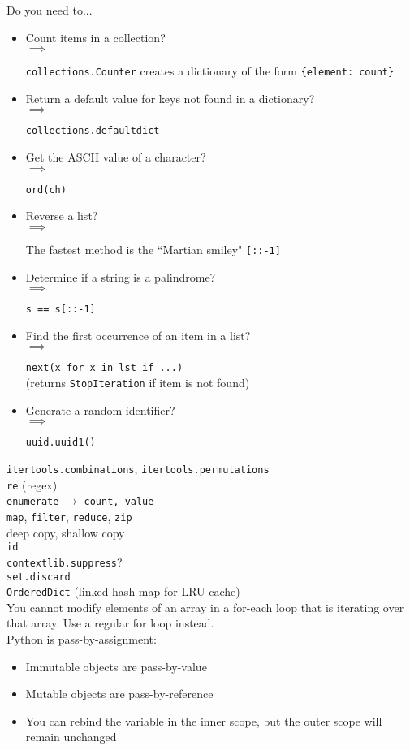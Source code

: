 \documentclass[12pt, titlepage]{article}
\newcommand{\imply}[1]{
  \-\hspace{1em}$\implies$ \parbox[t]{11.2cm}{#1}
}
\begin{document}
Do you need to...
\begin{itemize}
  \item Count items in a collection? \smallskip\\
    \imply{\texttt{collections.Counter} creates a dictionary of the form \texttt{\{element: count\}}}
  \item Return a default value for keys not found in a dictionary? \smallskip\\
    \imply{\texttt{collections.defaultdict}}
  \item Get the ASCII value of a character? \smallskip\\
    \imply{\texttt{ord(ch)}}
  \item Reverse a list? \smallskip\\
    \imply{The fastest method is the ``Martian smiley" \texttt{[::-1]}}
  \item Determine if a string is a palindrome? \smallskip\\
    \imply{\texttt{s == s[::-1]}}
  \item Find the first occurrence of an item in a list? \smallskip\\
      \imply{\texttt{next(x for x in lst if ...)} \\
      (returns \texttt{StopIteration} if item is not found)}
  \item Generate a random identifier? \\
      \imply{\texttt{uuid.uuid1()}}
\end{itemize}

\texttt{itertools.combinations}, \texttt{itertools.permutations} \\
\texttt{re} (regex) \\
\texttt{enumerate} $\rightarrow$ \texttt{count, value} \\
\texttt{map}, \texttt{filter}, \texttt{reduce}, \texttt{zip} \\
deep copy, shallow copy \\
\texttt{id} \\
\texttt{contextlib.suppress}? \\
\texttt{set.discard} \\
\texttt{OrderedDict} (linked hash map for LRU cache) \\
You cannot modify elements of an array in a for-each loop that is iterating over that array. Use a regular for loop instead. \\
Python is pass-by-assignment: \\
\begin{itemize}
  \item Immutable objects are pass-by-value
  \item Mutable objects are pass-by-reference
  \item You can rebind the variable in the inner scope, but the outer scope will remain unchanged
\end{itemize}
\end{document}
